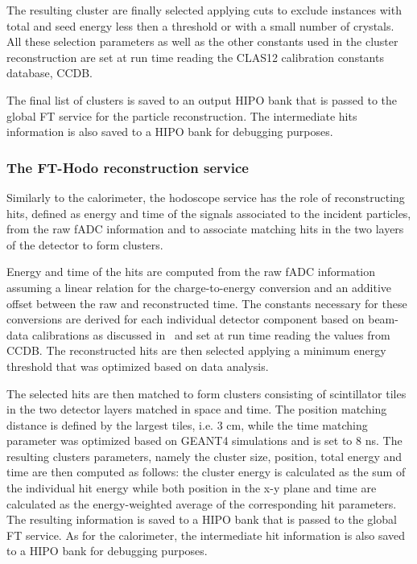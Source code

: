 \documentclass[3p,times,twocolumn]{elsarticle}
\begin{document}
The resulting cluster are finally selected applying cuts to exclude instances with total and seed energy less then a threshold or with a small number of crystals. All these selection parameters as well as the other constants used in the cluster reconstruction are set at run time reading the CLAS12 calibration constants database, CCDB.

The final list of clusters is saved to an output HIPO bank that is passed to the global FT service for the particle reconstruction. The intermediate hits information is also saved to a HIPO bank for debugging purposes.

\subsubsection{The FT-Hodo reconstruction service}
Similarly to the calorimeter, the hodoscope service has the role of reconstructing hits, defined as energy and time of the signals associated to the incident particles, from the raw fADC information and to associate matching hits in the two layers of the detector to form clusters.

Energy and time of the hits are computed from the raw fADC information assuming a linear relation for the charge-to-energy conversion and an additive offset between the raw and reconstructed time. The constants necessary for these conversions are derived for each individual detector component based on beam-data calibrations as discussed in~\cite{ft} and set at run time reading the values from CCDB. The reconstructed hits are then selected applying a minimum energy threshold that was optimized based on data analysis.

The selected hits are then matched to form clusters consisting of scintillator tiles in the two detector layers matched in space and time. The position matching distance is defined by the largest tiles, i.e. 3 cm, while the time matching parameter was optimized based on GEANT4 simulations and is set to 8 ns. The resulting clusters parameters, namely the cluster size, position, total energy and time are then computed as follows: the cluster energy is calculated as the sum of the individual hit energy while both position in the x-y  plane and time are calculated as the energy-weighted average of the corresponding hit parameters. The resulting information is saved to a HIPO bank that is passed to the global FT service. As for the calorimeter, the intermediate hit information is also saved to a HIPO bank for debugging purposes.
\end{document}

